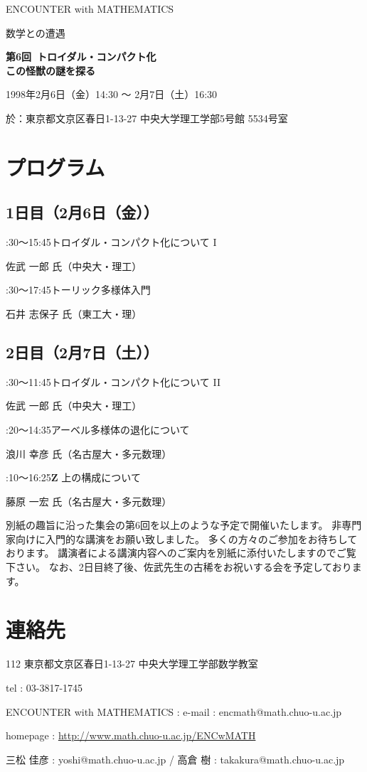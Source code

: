 \documentclass[uplatex,dvipdfmx]{jlreq}
\newcommand{\talk}[3]{%
\noindent
#1\quad #2\par
\hspace*{2em}#3\par\vspace{1mm}
}
\newcommand{\EwMnumber}{第6回}
\newcommand{\EwMtitle}{トロイダル・コンパクト化\\[1mm]\large この怪獣の謎を探る}
\newcommand{\EwMdate}{1998年2月6日（金）14:30 ～ 2月7日（土）16:30}
\newcommand{\EwMplace}{東京都文京区春日1-13-27 中央大学理工学部5号館 5534号室}
\newcommand{\EwMtitleblock}{

\vspace*{-7mm}

\begin{center}

{\Large ENCOUNTER with MATHEMATICS}

\vspace{1mm}

{\large 数学との遭遇}

\vspace{3mm}

{\Large \bfseries \EwMnumber\ \EwMtitle}

\vspace{3mm}

\EwMdate

\vspace{1mm}

於：\EwMplace

\end{center}

\vspace{2mm}

}
\begin{document}
\EwMtitleblock


\section*{\normalsize プログラム}

\subsection*{\normalsize 1日目（2月6日（金））}

\talk
{14:30～15:45}
{トロイダル・コンパクト化について I}
{佐武 一郎 氏（中央大・理工）}

\talk
{16:30～17:45}
{トーリック多様体入門}
{石井 志保子 氏（東工大・理）}

\subsection*{\normalsize 2日目（2月7日（土））}

\talk
{10:30～11:45}
{トロイダル・コンパクト化について II}
{佐武 一郎 氏（中央大・理工）}

\talk
{13:20～14:35}
{アーベル多様体の退化について}
{浪川 幸彦 氏（名古屋大・多元数理）}

\talk
{15:10～16:25}
{$\mathbf{Z}$ 上の構成について}
{藤原 一宏 氏（名古屋大・多元数理）}


\bigskip

別紙の趣旨に沿った集会の第6回を以上のような予定で開催いたします。  
非専門家向けに入門的な講演をお願い致しました。  
多くの方々のご参加をお待ちしております。  
講演者による講演内容へのご案内を別紙に添付いたしますのでご覧下さい。  
なお、2日目終了後、佐武先生の古稀をお祝いする会を予定しております。


\section*{\normalsize 連絡先}

112 東京都文京区春日1-13-27 中央大学理工学部数学教室

tel : 03-3817-1745  

ENCOUNTER with MATHEMATICS : e-mail : encmath@math.chuo-u.ac.jp  

homepage : \url{http://www.math.chuo-u.ac.jp/ENCwMATH}  

三松 佳彦 : yoshi@math.chuo-u.ac.jp / 高倉 樹 : takakura@math.chuo-u.ac.jp
\end{document}

